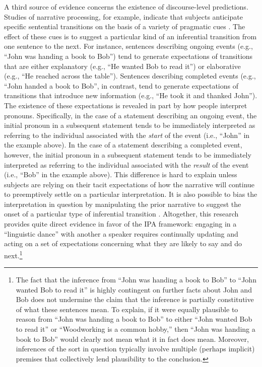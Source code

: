 A third source of evidence concerns the existence of discourse-level predictions. Studies of narrative processing, for example, indicate that subjects anticipate specific sentential transitions on the basis of a variety of pragmatic cues \citep{Rohde:2008}. The effect of these cues is to suggest a particular kind of an inferential transition from one sentence to the next. For instance, sentences describing ongoing events (e.g., ``John was handing a book to Bob'') tend to generate expectations of transitions that are either explanatory (e.g., ``He wanted Bob to read it'') or elaborative (e.g., ``He reached across the table''). Sentences describing completed events (e.g., ``John handed a book to Bob'', in contrast, tend to generate expectations of transitions that introduce new information (e.g., ``He took it and thanked John''). The existence of these expectations is revealed in part by how people interpret pronouns. Specifically, in the case of a statement describing an ongoing event, the initial pronoun in a subsequent statement tends to be immediately interpreted as referring to the individual associated with the \textit{start} of the event (i.e., ``John'' in the example above). In the case of a statement describing a completed event, however, the initial pronoun in a subsequent statement tends to be immediately interpreted as referring to the individual associated with the \textit{result} of the event (i.e., ``Bob'' in the example above). This difference is hard to explain unless subjects are relying on their tacit expectations of how the narrative will continue to preemptively settle on a particular interpretation. It is also possible to bias the interpretation in question by manipulating the prior narrative to suggest the onset of a particular type of inferential transition \citep{Rohde:2008}. Altogether, this research provides quite direct evidence in favor of the IPA framework: engaging in a ``linguistic dance'' with another a speaker requires continually updating and acting on a set of expectations concerning what they are likely to say and do next.\footnote{The fact that the inference from ``John was handing a book to Bob'' to ``John wanted Bob to read it'' is highly contingent on further facts about John and Bob does not undermine the claim that the inference is partially constitutive of what these sentences mean. To explain, if it were equally plausible to reason from ``John was handing a book to Bob'' to either ``John wanted Bob to read it'' or ``Woodworking is a common hobby,'' then ``John was handing a book to Bob'' would clearly not mean what it in fact does mean. Moreover, inferences of the sort in question typically involve multiple (perhaps implicit) premises that collectively lend plausibility to the conclusion.}

